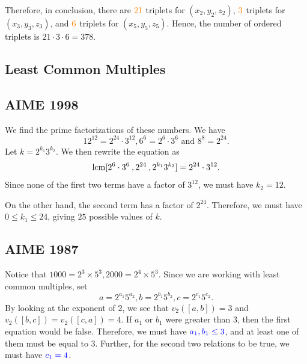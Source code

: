Therefore, in conclusion, there are $\color{orange} 21 \color{black}$ triplets for $(x_2, y_2, z_2)$, $\color{orange} 3 \color{black}$ triplets for $(x_3, y_3, z_3)$, and $\color{orange} 6 \color{black}$ triplets for $(x_5, y_5, z_5)$. Hence, the number of ordered triplets is $21\cdot 3\cdot 6=\boxed{378}$.

\clearpage

\subsection{Least Common Multiples}

\subsection{AIME 1998}

We find the prime factorizations of these numbers. We have $$12^{12}=2^{24}\cdot 3^{12}, 6^6=2^6\cdot 3^6 \text{ and } 8^8=2^{24}.$$ Let $k=2^{k_1}3^{k_2}$.  We then rewrite the equation as $$\operatorname{lcm}[2^6\cdot 3^6\:, 2^{24}\:, 2^{k_1}3^{k_2}]=2^{24}\cdot 3^{12}.$$ Since none of the first two terms have a factor of $3^{12}$, we must have $k_2=12$. 

On the other hand, the second term has a factor of $2^{24}$. Therefore, we must have $0\le k_1\le 24$, giving $\boxed{25}$ possible values of $k$.  
\subsection{AIME 1987}

Notice that $1000=2^3\times 5^3, 2000=2^4\times 5^3$.  Since we are working with least common multiples, set $$a=2^{a_1}5^{a_2}, b=2^{b_1}5^{b_2}, c=2^{c_1}5^{c_2}.$$
By looking at the exponent of $2$, we see that $v_2([a,b])=3$ and $v_2([b,c])=v_2([c,a])=4$.
If $a_1$ or $b_1$ were greater than $3$, then the first equation would be false. Therefore, we must have $\color{blue} a_1, b_1\le 3$, and \color{ForestGreen} at least one of them must be equal to $3$. \color{black} Further, for the second two relations to be true, we must have $\color{blue} c_1=4$.  

